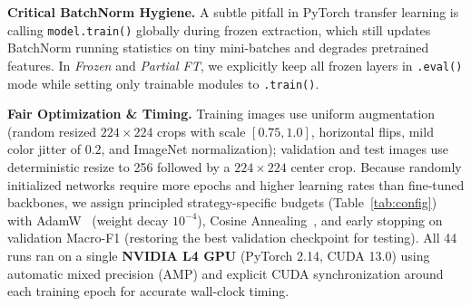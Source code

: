 \documentclass[sigconf,nonacm]{acmart}
\begin{document}
\textbf{Critical BatchNorm Hygiene.} A subtle pitfall in PyTorch transfer learning is calling \texttt{model.train()} globally during frozen extraction, which still updates BatchNorm running statistics on tiny mini-batches and degrades pretrained features. In \emph{Frozen} and \emph{Partial FT}, we explicitly keep all frozen layers in \texttt{.eval()} mode while setting only trainable modules to \texttt{.train()}.

\textbf{Fair Optimization \& Timing.} Training images use uniform augmentation (random resized $224\times 224$ crops with scale $[0.75, 1.0]$, horizontal flips, mild color jitter of $0.2$, and ImageNet normalization); validation and test images use deterministic resize to 256 followed by a $224\times 224$ center crop. Because randomly initialized networks require more epochs and higher learning rates than fine-tuned backbones, we assign principled strategy-specific budgets (Table~\ref{tab:config}) with AdamW~\cite{loshchilov2019decoupled} (weight decay $10^{-4}$), Cosine Annealing~\cite{loshchilov2017sgdr}, and early stopping on validation Macro-F1 (restoring the best validation checkpoint for testing). All 44 runs ran on a single \textbf{NVIDIA L4 GPU} (PyTorch 2.14, CUDA 13.0) using automatic mixed precision (AMP) and explicit CUDA synchronization around each training epoch for accurate wall-clock timing.

\begin{table}[t]
  \centering
  \caption{Training configuration per strategy on ResNet-18. Batch size is 32 for $\le$25\% data and 64 for $\ge$50\% data.}
  \label{tab:config}
  \renewcommand{\arraystretch}{0.92}
\end{table}
\end{document}
